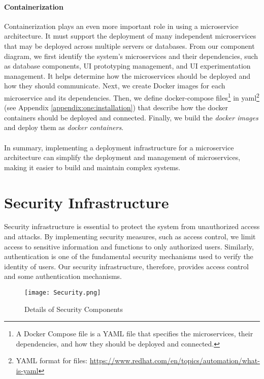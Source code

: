 \paragraph{Containerization}
Containerization plays an even more important role in using a microservice architecture. 
It must support the deployment of many independent microservices that may be deployed across multiple servers or databases.
From our component diagram, we first identify the system's microservices and their dependencies, such as database components, UI prototyping management, and UI experimentation management. 
It helps determine how the microservices should be deployed and how they should communicate.
Next, we create Docker images for each microservice and its dependencies.
Then, we define docker-compose files\footnote{A Docker Compose file is a YAML file that specifies the microservices, their dependencies, and how they should be deployed and connected.} in yaml\footnote{YAML format for files: \url{https://www.redhat.com/en/topics/automation/what-is-yaml}} (see Appendix \ref{appendix:one:installation}) that describe how the docker containers should be deployed and connected.
Finally, we build the \textit{docker images} and deploy them as \textit{docker containers}. \\\\
In summary, implementing a deployment infrastructure for a microservice architecture can simplify the deployment and management of microservices, making it easier to build and maintain complex systems.

\clearpage
\section{Security Infrastructure}
\label{sc:section:security}
Security infrastructure is essential to protect the system from unauthorized access and attacks. 
By implementing security measures, such as access control, we limit access to sensitive information and functions to only authorized users.
Similarly, authentication is one of the fundamental security mechanisms used to verify the identity of users.
Our security infrastructure, therefore, provides access control and some authentication mechanisms.

\begin{figure}[htbp!]
    \centering    
    \texttt{[image: Security.png]} 
    \caption[Details of Security Components]{Details of Security Components}
    \label{fig:sc:security}
\end{figure}


